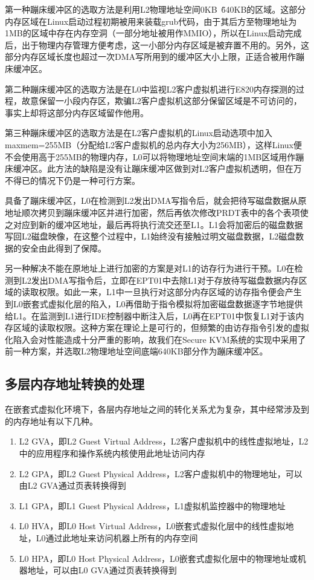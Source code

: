 第一种蹦床缓冲区的选取方法是利用L2物理地址空间0KB~\~640KB的区域。这部分内存区域在Linux启动过程初期被用来装载grub代码，由于其后方至物理地址为1MB的区域中存在内存空洞（一部分地址被用作MMIO），所以在Linux启动完成后，出于物理内存管理方便考虑，这一小部分内存区域是被弃置不用的。另外，这部分内存区域长度也超过一次DMA写所用到的缓冲区大小上限，正适合被用作蹦床缓冲区。

第二种蹦床缓冲区的选取方法是在L0中监视L2客户虚拟机进行E820内存探测的过程，故意保留一小段内存区，欺骗L2客户虚拟机这部分保留区域是不可访问的，事实上却将这部分内存区域留作他用。

第三种蹦床缓冲区的选取方法是在L2客户虚拟机的Linux启动选项中加入maxmem=255MB（分配给L2客户虚拟机的总内存大小为256MB），这样Linux便不会使用高于255MB的物理内存，L0可以将物理地址空间末端的1MB区域用作蹦床缓冲区。此方法的缺陷是没有让蹦床缓冲区做到对L2客户虚拟机透明，但在万不得已的情况下仍是一种可行方案。

具备了蹦床缓冲区，L0在检测到L2发出DMA写指令后，就会把待写磁盘数据从原地址顺次拷贝到蹦床缓冲区并进行加密，然后再依次修改PRDT表中的各个表项使之对应到新的缓冲区地址，最后再将执行流交还至L1。L1会将加密后的磁盘数据写回L2磁盘映像，在这整个过程中，L1始终没有接触过明文磁盘数据，L2磁盘数据的安全由此得到了保障。

另一种解决不能在原地址上进行加密的方案是对L1的访存行为进行干预。L0在检测到L2发出DMA写指令后，立即在EPT01中去除L1对于存放待写磁盘数据内存区域的读取权限。如此一来，L1中一旦执行对这部分内存区域的访存指令便会产生到L0嵌套式虚拟化层的陷入，L0再借助于指令模拟将加密磁盘数据逐字节地提供给L1。在监测到L1进行IDE控制器中断注入后，L0再在EPT01中恢复L1对于该内存区域的读取权限。这种方案在理论上是可行的，但频繁的由访存指令引发的虚拟化陷入会对性能造成十分严重的影响，故我们在Secure KVM系统的实现中采用了前一种方案，并选取L2物理地址空间底端640KB部分作为蹦床缓冲区。

\subsection{多层内存地址转换的处理}

在嵌套式虚拟化环境下，各层内存地址之间的转化关系尤为复杂，其中经常涉及到的内存地址有以下几种。

\begin{enumerate}
\item L2 GVA，即L2 Guest Virtual Address，L2客户虚拟机中的线性虚拟地址，L2中的应用程序和操作系统内核使用此地址访问内存
\item L2 GPA，即L2 Guest Physical Address，L2客户虚拟机中的物理地址，可以由L2 GVA通过页表转换得到
\item L1 GPA，即L1 Guest Physical Address，L1虚拟机监控器中的物理地址
\item L0 HVA，即L0 Host Virtual Address，L0嵌套式虚拟化层中的线性虚拟地址，L0通过此地址来访问机器上所有的内存空间
\item L0 HPA，即L0 Host Physical Address，L0嵌套式虚拟化层中的物理地址或机器地址，可以由L0 GVA通过页表转换得到
\end{enumerate}

